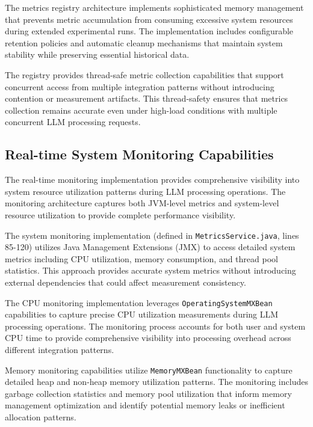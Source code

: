 The metrics registry architecture implements sophisticated memory management that prevents metric accumulation from consuming excessive system resources during extended experimental runs. The implementation includes configurable retention policies and automatic cleanup mechanisms that maintain system stability while preserving essential historical data.

The registry provides thread-safe metric collection capabilities that support concurrent access from multiple integration patterns without introducing contention or measurement artifacts. This thread-safety ensures that metrics collection remains accurate even under high-load conditions with multiple concurrent LLM processing requests.

\subsection{Real-time System Monitoring Capabilities}

The real-time monitoring implementation provides comprehensive visibility into system resource utilization patterns during LLM processing operations. The monitoring architecture captures both JVM-level metrics and system-level resource utilization to provide complete performance visibility.

The system monitoring implementation (defined in \texttt{MetricsService.java}, lines 85-120) utilizes Java Management Extensions (JMX) to access detailed system metrics including CPU utilization, memory consumption, and thread pool statistics. This approach provides accurate system metrics without introducing external dependencies that could affect measurement consistency.


The CPU monitoring implementation leverages \texttt{OperatingSystemMXBean} capabilities to capture precise CPU utilization measurements during LLM processing operations. The monitoring process accounts for both user and system CPU time to provide comprehensive visibility into processing overhead across different integration patterns.

Memory monitoring capabilities utilize \texttt{MemoryMXBean} functionality to capture detailed heap and non-heap memory utilization patterns. The monitoring includes garbage collection statistics and memory pool utilization that inform memory management optimization and identify potential memory leaks or inefficient allocation patterns.

